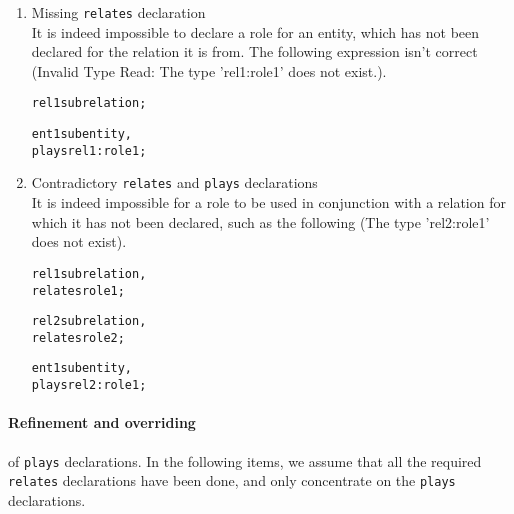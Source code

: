 \documentclass[runningheads]{llncs}
\begin{document}
\begin{enumerate}
\item Missing \texttt{relates} declaration \\
It is indeed impossible to declare a role for an entity, which has not been declared for the relation it is from. The following expression isn't correct (Invalid Type Read: The type 'rel1:role1' does not exist.).

  \begin{alltt}
rel1 sub relation;

ent1 sub entity,
  plays rel1:role1;
  \end{alltt}

\item Contradictory \texttt{relates} and \texttt{plays} declarations\\
It is indeed impossible for a role to be used in conjunction with a relation for which it has not been declared, such as the following (The type 'rel2:role1' does not exist).

  \begin{alltt}
rel1 sub relation,
  relates role1;

rel2 sub relation,
  relates role2;

ent1 sub entity,
  plays rel2:role1;
  \end{alltt}

\end{enumerate}


\paragraph{Refinement and overriding} of \texttt{plays} declarations. In the
following items, we assume that all the required \texttt{relates}
declarations have been done, and only concentrate on the \texttt{plays}
declarations.
\end{document}
